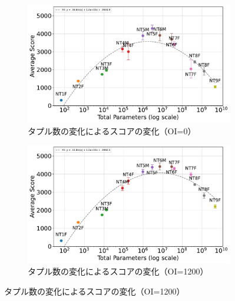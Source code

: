\begin{figure}[t]
    \centering
    \begin{subfigure}[b]{\linewidth}
        \centering
        \includegraphics[width=\linewidth]{pdf/parameter_performance_plots/params_performance_OI0_EXP1.pdf}
        \caption{タプル数の変化によるスコアの変化（OI=0）}
        \label{fig:score_vs_tuple_OI0}
    \end{subfigure}

    \vspace{1em}
    \begin{subfigure}[b]{\linewidth}
        \centering
        \includegraphics[width=\linewidth]{pdf/parameter_performance_plots/params_performance_OI1200_EXP1.pdf}
        \caption{タプル数の変化によるスコアの変化（OI=1200）}
        \label{fig:score_vs_tuple_OI1200}
    \end{subfigure}


\end{figure}
